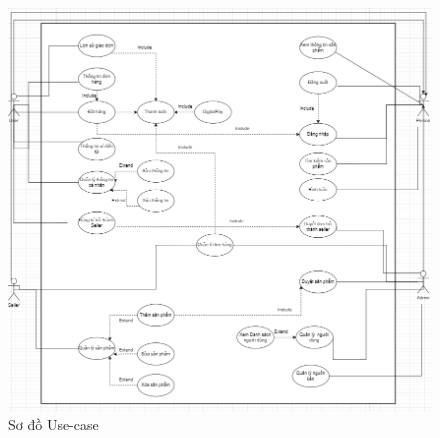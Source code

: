 \documentclass{article}
\begin{document}
\begin{center}
	\begin{figure}[htp]
		\begin{center}
			\includegraphics[scale=.750]{anh9.png}
		\end{center}
		\caption{Sơ đồ Use-case}
		
	\end{figure}
\end{center}
\end{document}

